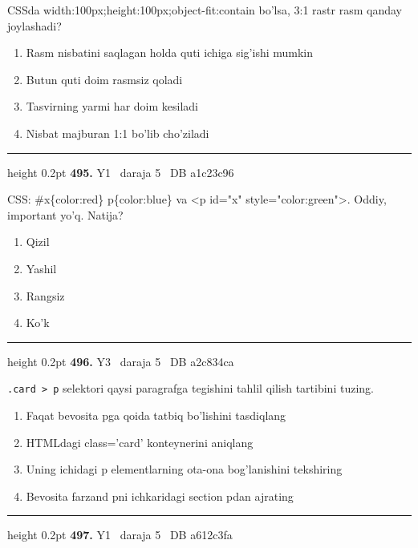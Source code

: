 \documentclass[10pt,a4paper,oneside]{article}
\begin{document}
CSSda width:100px;height:100px;object-fit:contain bo'lsa, 3:1 rastr rasm qanday joylashadi?
\begin{enumerate}[label=\Alph*),leftmargin=9mm]
\item Rasm nisbatini saqlagan holda quti ichiga sig'ishi mumkin
\item Butun quti doim rasmsiz qoladi
\item Tasvirning yarmi har doim kesiladi
\item Nisbat majburan 1:1 bo'lib cho'ziladi
\end{enumerate}
\vspace{2mm}\hrule height 0.2pt \vspace{4mm}
\hypertarget{q495}{\textbf{\color{ink}495.}}  {\color{muted}\scriptsize Y1 \textbullet\ daraja 5 \textbullet\ DB a1c23c96}
\par
CSS: \#x\{color:red\} p\{color:blue\} va \textless{}p id="x" style="color:green"\textgreater{}. Oddiy, important yo'q. Natija?
\begin{enumerate}[label=\Alph*),leftmargin=9mm]
\item Qizil
\item Yashil
\item Rangsiz
\item Ko'k
\end{enumerate}
\vspace{2mm}\hrule height 0.2pt \vspace{4mm}
\hypertarget{q496}{\textbf{\color{ink}496.}}  {\color{muted}\scriptsize Y3 \textbullet\ daraja 5 \textbullet\ DB a2c834ca}
\par
\texttt{.card \textgreater{} p} selektori qaysi paragrafga tegishini tahlil qilish tartibini tuzing.
\begin{enumerate}[label=\Alph*),leftmargin=9mm]
\item Faqat bevosita pga qoida tatbiq bo'lishini tasdiqlang
\item HTMLdagi class='card' konteynerini aniqlang
\item Uning ichidagi p elementlarning ota-ona bog'lanishini tekshiring
\item Bevosita farzand pni ichkaridagi section pdan ajrating
\end{enumerate}
\vspace{2mm}\hrule height 0.2pt \vspace{4mm}
\hypertarget{q497}{\textbf{\color{ink}497.}}  {\color{muted}\scriptsize Y1 \textbullet\ daraja 5 \textbullet\ DB a612c3fa}
\end{document}
